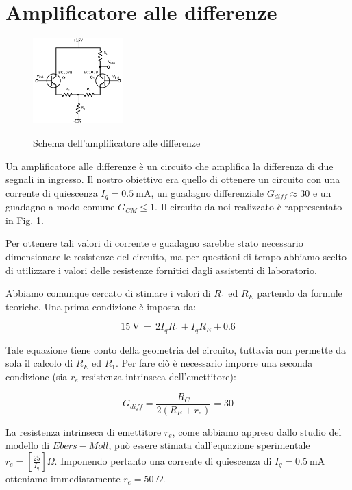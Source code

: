 \section{Amplificatore alle differenze}
\begin{figure}
	\caption{Schema dell'amplificatore alle differenze}
	\includegraphics[width=35mm]{cc1.pdf}
	\label{fig:cc1}
\end{figure}

Un amplificatore alle differenze è un circuito che amplifica la differenza di due segnali in ingresso.
Il nostro obiettivo era quello di ottenere un circuito con una corrente di quiescenza $I_q=\SI{0.5}{\milli\ampere}$, un guadagno differenziale $G_{diff}\approx 30$ e un guadagno a modo comune $G_{CM} \leq 1$.
Il circuito da noi realizzato è rappresentato in Fig. \ref{fig:cc1}.

Per ottenere tali valori di corrente e guadagno sarebbe stato necessario dimensionare le resistenze del circuito, ma per questioni di tempo abbiamo scelto di utilizzare i valori delle resistenze fornitici dagli assistenti di laboratorio.

Abbiamo comunque cercato di stimare i valori di $R_1$ ed $R_E$ partendo da formule teoriche.
Una prima condizione è imposta da:

\begin{equation}
\SI{15}{\volt} \,= \, 2I_q R_1 + I_q R_E + 0.6
\label{eq:1}
\end{equation}

\noindent Tale equazione tiene conto della geometria del circuito, tuttavia non permette da sola il calcolo di $R_E$ ed $R_1$.
Per fare ciò è necessario imporre una seconda condizione (sia $r_e$ resistenza intrinseca dell'emettitore):

\begin{equation}
G_{diff}=\frac{R_C}{2(R_E+r_e)} = 30
\label{eq:2}
\end{equation}

La resistenza intrinseca di emettitore $r_e$, come abbiamo appreso dallo studio del modello di $Ebers-Moll$, può essere stimata dall'equazione sperimentale $r_e = \left[ \frac{25}{I_q} \right] \Omega$.
Imponendo pertanto una corrente di quiescenza di $I_q = \SI{0.5}{\milli\ampere}$ otteniamo immediatamente $r_e = 50\, \Omega$.

